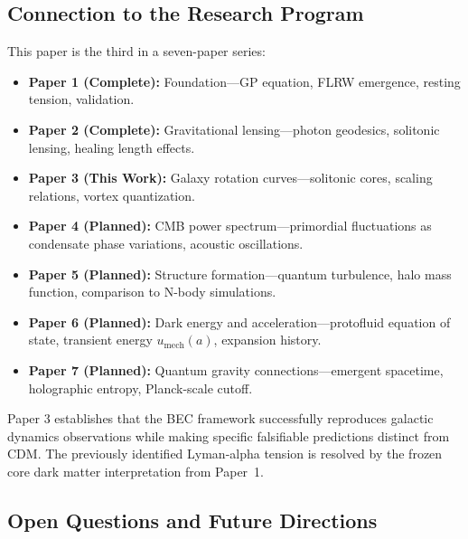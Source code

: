 \documentclass[11pt,a4paper]{article}
\newcommand{\umech}{\ensuremath{u_{\mathrm{mech}}}}
\theoremstyle{definition}
\theoremstyle{remark}
\begin{document}
\subsection{Connection to the Research Program}
\label{sec:research_program}

This paper is the third in a seven-paper series:

\begin{itemize}[leftmargin=*, itemsep=0.3em]

\item \textbf{Paper 1 (Complete):} Foundation---GP equation, FLRW emergence, resting tension, validation.

\item \textbf{Paper 2 (Complete):} Gravitational lensing---photon geodesics, solitonic lensing, healing length effects.

\item \textbf{Paper 3 (This Work):} Galaxy rotation curves---solitonic cores, scaling relations, vortex quantization.

\item \textbf{Paper 4 (Planned):} CMB power spectrum---primordial fluctuations as condensate phase variations, acoustic oscillations.

\item \textbf{Paper 5 (Planned):} Structure formation---quantum turbulence, halo mass function, comparison to N-body simulations.

\item \textbf{Paper 6 (Planned):} Dark energy and acceleration---protofluid equation of state, transient energy $\umech(a)$, expansion history.

\item \textbf{Paper 7 (Planned):} Quantum gravity connections---emergent spacetime, holographic entropy, Planck-scale cutoff.

\end{itemize}

Paper 3 establishes that the BEC framework successfully reproduces galactic dynamics observations while making specific falsifiable predictions distinct from CDM. The previously identified Lyman-alpha tension is resolved by the frozen core dark matter interpretation from Paper~1.

\subsection{Open Questions and Future Directions}
\label{sec:future_directions}
\end{document}
